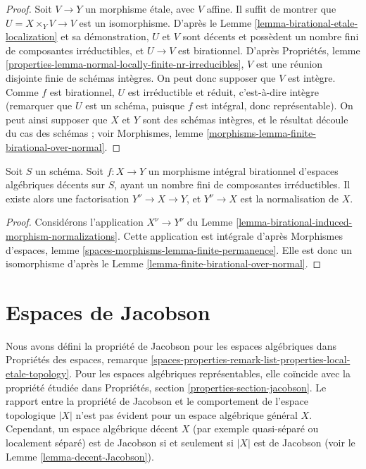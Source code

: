 \begin{proof}
Soit $V \to Y$ un morphisme étale, avec $V$ affine. Il suffit de montrer que
$U = X \times_Y V \to V$ est un isomorphisme. D'après le
Lemme \ref{lemma-birational-etale-localization} et sa démonstration,
$U$ et $V$ sont décents et possèdent un nombre fini de composantes
irréductibles, et $U \to V$ est birationnel. D'après Propriétés, lemme
\ref{properties-lemma-normal-locally-finite-nr-irreducibles},
$V$ est une réunion disjointe finie de schémas intègres.
On peut donc supposer que $V$ est intègre. Comme $f$ est birationnel, $U$ est
irréductible et réduit, c'est-à-dire intègre
(remarquer que $U$ est un schéma, puisque $f$ est intégral, donc
représentable). On peut ainsi supposer que $X$ et $Y$ sont des schémas
intègres, et le résultat découle du cas des schémas ; voir Morphismes, lemme
\ref{morphisms-lemma-finite-birational-over-normal}.
\end{proof}

\begin{lemma}
\label{lemma-normalization-normal}
Soit $S$ un schéma. Soit $f : X \to Y$ un morphisme intégral birationnel
d'espaces algébriques décents sur $S$, ayant un nombre fini de composantes
irréductibles. Il existe alors une factorisation $Y^\nu \to X \to Y$, et
$Y^\nu \to X$ est la normalisation de $X$.
\end{lemma}

\begin{proof}
Considérons l'application $X^\nu \to Y^\nu$ du
Lemme \ref{lemma-birational-induced-morphism-normalizations}.
Cette application est intégrale d'après Morphismes d'espaces, lemme
\ref{spaces-morphisms-lemma-finite-permanence}.
Elle est donc un isomorphisme d'après le
Lemme \ref{lemma-finite-birational-over-normal}.
\end{proof}




\section{Espaces de Jacobson}
\label{section-jacobson}

\noindent
Nous avons défini la propriété de Jacobson pour les espaces algébriques dans
Propriétés des espaces, remarque
\ref{spaces-properties-remark-list-properties-local-etale-topology}.
Pour les espaces algébriques représentables, elle coïncide avec la propriété
étudiée dans Propriétés, section \ref{properties-section-jacobson}.
Le rapport entre la propriété de Jacobson et le comportement de l'espace
topologique $|X|$ n'est pas évident pour un espace algébrique général $X$.
Cependant, un espace algébrique décent $X$ (par exemple quasi-séparé ou
localement séparé) est de Jacobson si et seulement si $|X|$ est de Jacobson
(voir le Lemme \ref{lemma-decent-Jacobson}).

